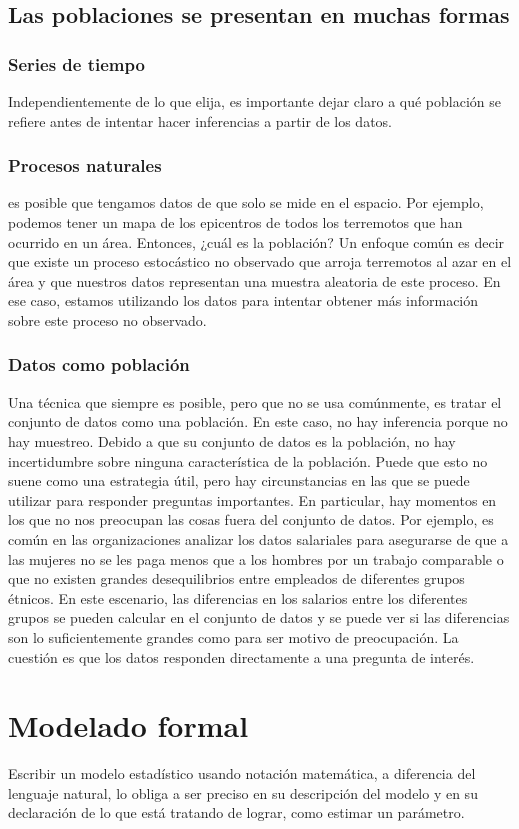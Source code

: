 \documentclass[10pt]{book}
\begin{document}
    \section{Las poblaciones se presentan en muchas formas}
	\subsection{Series de tiempo}
	Independientemente de lo que elija, es importante dejar claro a qué población se refiere antes de intentar hacer inferencias a partir de los datos.
	\subsection{Procesos naturales}
	es posible que tengamos datos de que solo se mide en el espacio. Por ejemplo, podemos tener un mapa de los epicentros de todos los terremotos que han ocurrido en un área. Entonces, ¿cuál es la población? Un enfoque común es decir que existe un proceso estocástico no observado que arroja terremotos al azar en el área y que nuestros datos representan una muestra aleatoria de este proceso. En ese caso, estamos utilizando los datos para intentar obtener más información sobre este proceso no observado.
	\subsection{Datos como población}	
	Una técnica que siempre es posible, pero que no se usa comúnmente, es tratar el conjunto de datos como una población. En este caso, no hay inferencia porque no hay muestreo. Debido a que su conjunto de datos es la población, no hay incertidumbre sobre ninguna característica de la población. Puede que esto no suene como una estrategia útil, pero hay circunstancias en las que se puede utilizar para responder preguntas importantes. En particular, hay momentos en los que no nos preocupan las cosas fuera del conjunto de datos. Por ejemplo, es común en las organizaciones analizar los datos salariales para asegurarse de que a las mujeres no se les paga menos que a los hombres por un trabajo comparable o que no existen grandes desequilibrios entre empleados de diferentes grupos étnicos. En este escenario, las diferencias en los salarios entre los diferentes grupos se pueden calcular en el conjunto de datos y se puede ver si las diferencias son lo suficientemente grandes como para ser motivo de preocupación. La cuestión es que los datos responden directamente a una pregunta de interés.

\chapter{Modelado formal}
Escribir un modelo estadístico usando notación matemática, a diferencia del lenguaje natural, lo obliga a ser preciso en su descripción del modelo y en su declaración de lo que está tratando de lograr, como estimar un parámetro.
\end{document}

